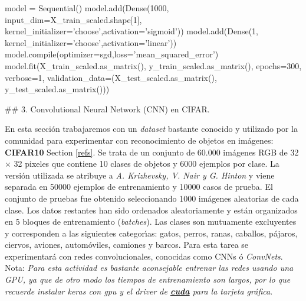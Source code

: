 \documentclass[11pt]{article}
\newenvironment{Shaded}{}{}
\newcommand{\DecValTok}[1]{\textcolor[rgb]{0.25,0.63,0.44}{{#1}}}
\newcommand{\StringTok}[1]{\textcolor[rgb]{0.25,0.44,0.63}{{#1}}}
\newcommand{\NormalTok}[1]{{#1}}
\newcommand{\OperatorTok}[1]{\textcolor[rgb]{0.40,0.40,0.40}{{#1}}}
\newcommand{\BuiltInTok}[1]{{#1}}
\begin{document}
\begin{Shaded}
\begin{Highlighting}[]
\NormalTok{model }\OperatorTok{=}\NormalTok{ Sequential()}
\NormalTok{model.add(Dense(}\DecValTok{1000}\NormalTok{, input_dim}\OperatorTok{=}\NormalTok{X_train_scaled.shape[}\DecValTok{1}\NormalTok{], kernel_initializer}\OperatorTok{=}\StringTok{'choose'}\NormalTok{,activation}\OperatorTok{=}\StringTok{'sigmoid'}\NormalTok{))}
\NormalTok{model.add(Dense(}\DecValTok{1}\NormalTok{, kernel_initializer}\OperatorTok{=}\StringTok{'choose'}\NormalTok{,activation}\OperatorTok{=}\StringTok{'linear'}\NormalTok{))}
\NormalTok{model.}\BuiltInTok{compile}\NormalTok{(optimizer}\OperatorTok{=}\NormalTok{sgd,loss}\OperatorTok{=}\StringTok{'mean_squared_error'}\NormalTok{)}
\NormalTok{model.fit(X_train_scaled.as_matrix(), y_train_scaled.as_matrix(), epochs}\OperatorTok{=}\DecValTok{300}\NormalTok{,}
\NormalTok{    verbose}\OperatorTok{=}\DecValTok{1}\NormalTok{, validation_data}\OperatorTok{=}\NormalTok{(X_test_scaled.as_matrix(), y_test_scaled.as_matrix()))}
\end{Highlighting}
\end{Shaded}

     \#\# 3. Convolutional Neural Network (CNN) en CIFAR.

En esta sección trabajaremos con un \emph{dataset} bastante conocido y
utilizado por la comunidad para experimentar con reconocimiento de
objetos en imágenes: \textbf{CIFAR10} Section \ref{refs}. Se trata de un
conjunto de 60.000 imágenes RGB de 32 × 32 pixeles que contiene 10
clases de objetos y 6000 ejemplos por clase. La versión utilizada se
atribuye a \emph{A. Krizhevsky, V. Nair y G. Hinton} y viene separada en
50000 ejemplos de entrenamiento y 10000 casos de prueba. El conjunto de
pruebas fue obtenido seleccionando 1000 imágenes aleatorias de cada
clase. Los datos restantes han sido ordenados aleatoriamente y están
organizados en 5 bloques de entrenamiento (\emph{batches}). Las clases
son mutuamente excluyentes y corresponden a las siguientes categorı́as:
gatos, perros, ranas, caballos, pájaros, ciervos, aviones, automóviles,
camiones y barcos. Para esta tarea se experimentará con redes
convolucionales, conocidas como CNNs ó \emph{ConvNets}.\\
Nota: \emph{Para esta actividad es bastante aconsejable entrenar las
redes usando una GPU, ya que de otro modo los tiempos de entrenamiento
son largos, por lo que recuerde instalar keras con gpu y el driver de
\textbf{\href{https://developer.nvidia.com/cuda-downloads}{cuda}} para
la tarjeta gráfica}.
\end{document}
